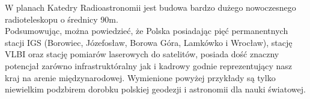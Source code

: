 \noindent W planach Katedry Radioastronomii jest budowa bardzo dużego nowoczesnego radioteleskopu o średnicy 90m.\\
\indent Podsumowując, można powiedzieć, że Polska posiadając pięć permanentnych stacji IGS (Borowiec, Józefosław, Borowa Góra, Lamkówko i Wrocław), stację VLBI oraz stację
pomiarów laserowych do satelitów, posiada dość znaczny potencjał zarówno infrastruktóralny jak i kadrowy godnie reprezentujący nasz kraj na arenie międzynarodowej.
Wymienione powyżej przykłady są tylko niewielkim podzbirem dorobku polskiej geodezji i astronomii dla nauki światowej.


